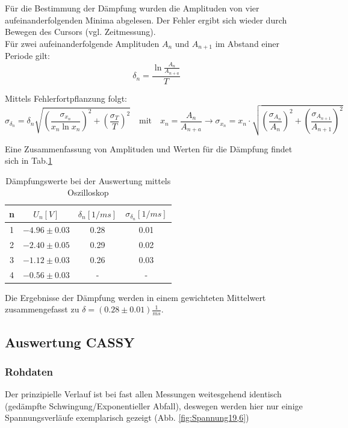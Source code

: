 \documentclass[12pt,a4paper]{article}
\begin{document}
Für die Bestimmung der Dämpfung wurden die Amplituden von vier aufeinanderfolgenden Minima abgelesen. Der Fehler ergibt sich wieder durch Bewegen des Cursors (vgl. Zeitmessung).\\
Für zwei aufeinanderfolgende Amplituden $A_n$ und $A_{n+1}$ im Abstand einer Periode gilt:
\begin{equation}
\delta_n=\frac{\ln{\frac{A_n}{A_{n+a}}}}{T}
\end{equation}

Mittels Fehlerfortpflanzung folgt:
\begin{equation}
\sigma_{\delta_n}=\delta_n \sqrt{(\frac{\sigma_{x_n}}{x_n \ln{x_n}})^2+(\frac{\sigma_T}{T})^2} \quad \text{mit} \quad x_n=\frac{A_n}{A_{n+a}} \rightarrow \sigma_{x_n}=x_n\cdot \sqrt{(\frac{\sigma_{A_n}}{A_n})^2+(\frac{\sigma_{A_{n+1}}}{A_{n+1}})^2}
\end{equation}

Eine Zusammenfassung von Amplituden und Werten für die Dämpfung findet sich in Tab.\ref{tab:DämpfungOszi}
\begin{table}
\begin{center}
\begin{tabular}{|c|c|c|c|}
\hline
n & $U_n[V]$ & $\delta_n[1/ms]$ & $\sigma_{\delta_n}[1/ms]$\\
\hline
1 & $-4.96 \pm 0.03$ & 0.28 & 0.01\\
\hline
2 & $-2.40 \pm 0.05$ & 0.29 & 0.02\\
\hline
3 & $-1.12 \pm 0.03$ & 0.26 & 0.03\\
\hline
4 & $-0.56 \pm 0.03$ & - & -\\
\hline
\end{tabular}
\end{center}
\caption{Dämpfungswerte bei der Auswertung mittels Oszilloskop}
\label{tab:DämpfungOszi}
\end{table}

Die Ergebnisse der Dämpfung werden in einem gewichteten Mittelwert zusammengefasst zu $\delta=(0.28 \pm 0.01)\frac{1}{ms}$.



\subsection{Auswertung CASSY}
\subsubsection{Rohdaten}
Der prinzipielle Verlauf ist bei fast allen Messungen weitesgehend identisch (gedämpfte Schwingung/Exponentieller Abfall), deswegen werden hier nur einige Spannungsverläufe exemplarisch gezeigt (Abb. \ref{fig:Spannung19,6})
\end{document}

